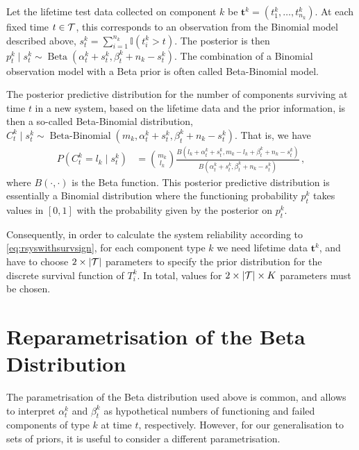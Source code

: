 \documentclass[12pt, a4paper]{elsarticle}
\newcommand{\bs}[1]{\boldsymbol{#1}}
\renewcommand{\vec}[1]{{\bs#1}}
\newcommand{\indic}{\mathbb{I}}
\newcommand{\be}{\operatorname{Beta}}
\newcommand{\bebin}{\operatorname{Beta-Binomial}}
\newcommand{\ptk}{p^k_t}
\begin{document}
Let the lifetime test data collected on component $k$ be $\vec{t}^k = (t^k_1, \ldots, t^k_{n_k})$.
At each fixed time $t \in {\cal T}$, this corresponds to an observation from the Binomial model described above,
$s^k_t = \sum_{i=1}^{n_k} \indic(t^k_i > t)$.
The posterior is then $\ptk \mid s^k_t \sim \be(\alpha^k_t + s^k_t, \beta^k_t + n_k - s^k_t)$.
The combination of a Binomial observation model with a Beta prior is often called Beta-Binomial model.

The posterior predictive distribution for the number of components surviving at time $t$
in a new system, based on the lifetime data and the prior information,
is then a so-called Beta-Binomial distribution,
$C^k_t \mid s^k_t \sim \bebin(m_k, \alpha^k_t + s^k_t, \beta^k_t + n_k - s^k_t)$.
That is, we have
\begin{align*}
P(C^k_t = l_k \mid s^k_t) &= {m_k \choose l_k} \frac{B(l_k + \alpha^k_t + s^k_t, m_k - l_k + \beta^k_t + n_k - s^k_t)}
                                                    {B(\alpha^k_t + s^k_t, \beta^k_t + n_k - s^k_t)} \,,
\end{align*}
where $B(\cdot, \cdot)$ is the Beta function.
This posterior predictive distribution is essentially a Binomial distribution
where the functioning probability $\ptk$ takes values in $[0,1]$
with the probability given by the posterior on $\ptk$.

Consequently, in order to calculate the system reliability according to \eqref{eq:rsyswithsurvsign},
for each component type $k$
we need lifetime data $\vec{t}^k$,
and have to choose $2 \times |{\cal T}|$ parameters
to specify the prior distribution for the discrete survival function of $T^k_i$.
In total, values for $2 \times |{\cal T}| \times K$ parameters must be chosen.


\section{Reparametrisation of the Beta Distribution}

The parametrisation of the Beta distribution used above is common,
and allows to interpret $\alpha^k_t$ and $\beta^k_t$ as
hypothetical numbers of functioning and failed components of type $k$ at time $t$, respectively.
However, for our generalisation to sets of priors,
it is useful to consider a different parametrisation.
\end{document}
